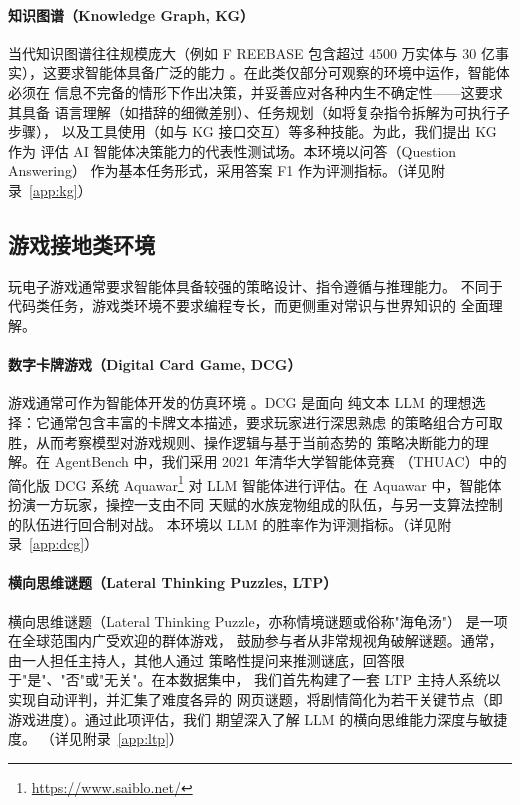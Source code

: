 \paragraph{知识图谱（Knowledge Graph, KG）\citep{anonymous2023kg}}
当代知识图谱往往规模庞大（例如 F REEBASE \citep{bollacker2008}
包含超过 4500 万实体与 30 亿事实），这要求智能体具备广泛的能力
\citep{gu2023discriminate}。在此类仅部分可观察的环境中运作，智能体必须在
信息不完备的情形下作出决策，并妥善应对各种内生不确定性——这要求其具备
语言理解（如措辞的细微差别）、任务规划（如将复杂指令拆解为可执行子步骤），
以及工具使用（如与 KG 接口交互）等多种技能。为此，我们提出 KG 作为
评估 AI 智能体决策能力的代表性测试场。本环境以问答（Question Answering）
作为基本任务形式，采用答案 F1 作为评测指标。（详见附录~\ref{app:kg}）

\subsection{游戏接地类环境}

玩电子游戏通常要求智能体具备较强的策略设计、指令遵循与推理能力。
不同于代码类任务，游戏类环境不要求编程专长，而更侧重对常识与世界知识的
全面理解。

\paragraph{数字卡牌游戏（Digital Card Game, DCG）}
游戏通常可作为智能体开发的仿真环境 \citep{hoover2020}。DCG 是面向
纯文本 LLM 的理想选择：它通常包含丰富的卡牌文本描述，要求玩家进行深思熟虑
的策略组合方可取胜，从而考察模型对游戏规则、操作逻辑与基于当前态势的
策略决断能力的理解。在 AgentBench 中，我们采用 2021 年清华大学智能体竞赛
（THUAC）中的简化版 DCG 系统 Aquawar\footnote{\url{https://www.saiblo.net/}}
对 LLM 智能体进行评估。在 Aquawar 中，智能体扮演一方玩家，操控一支由不同
天赋的水族宠物组成的队伍，与另一支算法控制的队伍进行回合制对战。
本环境以 LLM 的胜率作为评测指标。（详见附录~\ref{app:dcg}）

\paragraph{横向思维谜题（Lateral Thinking Puzzles, LTP）}
横向思维谜题（Lateral Thinking Puzzle，亦称情境谜题或俗称"海龟汤"）
\citep{sloane1992,debono1970} 是一项在全球范围内广受欢迎的群体游戏，
鼓励参与者从非常规视角破解谜题。通常，由一人担任主持人，其他人通过
策略性提问来推测谜底，回答限于"是"、"否"或"无关"。在本数据集中，
我们首先构建了一套 LTP 主持人系统以实现自动评判，并汇集了难度各异的
网页谜题，将剧情简化为若干关键节点（即游戏进度）。通过此项评估，我们
期望深入了解 LLM 的横向思维能力深度与敏捷度。
（详见附录~\ref{app:ltp}）

